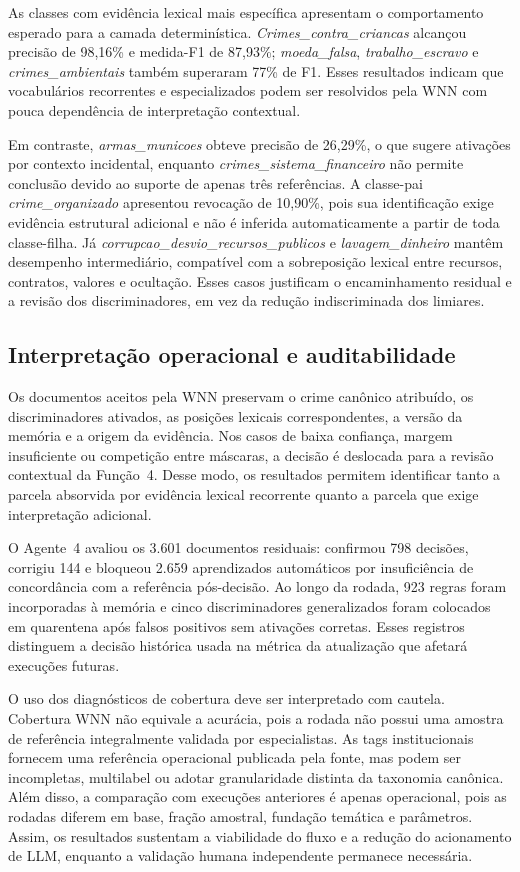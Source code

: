 As classes com evidência lexical mais específica apresentam o comportamento esperado para a camada determinística. \textit{Crimes\_contra\_criancas} alcançou precisão de 98,16\% e medida-F1 de 87,93\%; \textit{moeda\_falsa}, \textit{trabalho\_escravo} e \textit{crimes\_ambientais} também superaram 77\% de F1. Esses resultados indicam que vocabulários recorrentes e especializados podem ser resolvidos pela WNN com pouca dependência de interpretação contextual.

Em contraste, \textit{armas\_municoes} obteve precisão de 26,29\%, o que sugere ativações por contexto incidental, enquanto \textit{crimes\_sistema\_financeiro} não permite conclusão devido ao suporte de apenas três referências. A classe-pai \textit{crime\_organizado} apresentou revocação de 10,90\%, pois sua identificação exige evidência estrutural adicional e não é inferida automaticamente a partir de toda classe-filha. Já \textit{corrupcao\_desvio\_recursos\_publicos} e \textit{lavagem\_dinheiro} mantêm desempenho intermediário, compatível com a sobreposição lexical entre recursos, contratos, valores e ocultação. Esses casos justificam o encaminhamento residual e a revisão dos discriminadores, em vez da redução indiscriminada dos limiares.

\subsection{Interpretação operacional e auditabilidade}

Os documentos aceitos pela WNN preservam o crime canônico atribuído, os discriminadores ativados, as posições lexicais correspondentes, a versão da memória e a origem da evidência. Nos casos de baixa confiança, margem insuficiente ou competição entre máscaras, a decisão é deslocada para a revisão contextual da Função~4. Desse modo, os resultados permitem identificar tanto a parcela absorvida por evidência lexical recorrente quanto a parcela que exige interpretação adicional.

O Agente~4 avaliou os 3.601 documentos residuais: confirmou 798 decisões, corrigiu 144 e bloqueou 2.659 aprendizados automáticos por insuficiência de concordância com a referência pós-decisão. Ao longo da rodada, 923 regras foram incorporadas à memória e cinco discriminadores generalizados foram colocados em quarentena após falsos positivos sem ativações corretas. Esses registros distinguem a decisão histórica usada na métrica da atualização que afetará execuções futuras.

O uso dos diagnósticos de cobertura deve ser interpretado com cautela. Cobertura WNN não equivale a acurácia, pois a rodada não possui uma amostra de referência integralmente validada por especialistas. As tags institucionais fornecem uma referência operacional publicada pela fonte, mas podem ser incompletas, multilabel ou adotar granularidade distinta da taxonomia canônica. Além disso, a comparação com execuções anteriores é apenas operacional, pois as rodadas diferem em base, fração amostral, fundação temática e parâmetros. Assim, os resultados sustentam a viabilidade do fluxo e a redução do acionamento de LLM, enquanto a validação humana independente permanece necessária.

